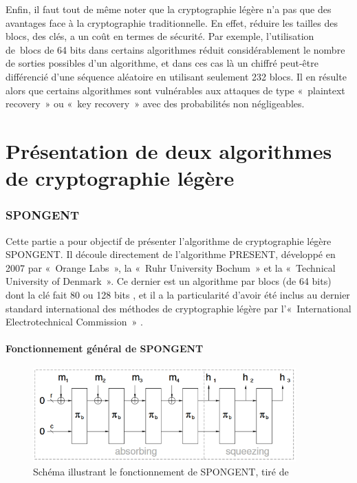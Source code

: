 			Enfin, il faut tout de même noter que la cryptographie légère n'a pas que des
		avantages face à la cryptographie traditionnelle. En effet, réduire les
		tailles des blocs, des clés, a un coût en termes de sécurité. Par exemple,
		l'utilisation de blocs de 64 bits dans certains algorithmes réduit
		considérablement le nombre de sorties possibles d'un algorithme, et dans ces
		cas là un chiffré peut-être différencié d'une séquence aléatoire en utilisant
		seulement 232 blocs. Il en résulte alors que certains algorithmes sont
		vulnérables aux attaques de type « plaintext recovery » ou « key recovery »
		avec des probabilités non négligeables.

\newpage
\part{Présentation de deux algorithmes de cryptographie légère}

	\section{SPONGENT}

			Cette partie a pour objectif de présenter l'algorithme de cryptographie légère
		SPONGENT. Il découle directement de l'algorithme PRESENT, développé en 2007
		par « Orange Labs », la « Ruhr University Bochum » et la « Technical
		University of Denmark ». Ce dernier est un algorithme par blocs (de 64 bits)
		dont la clé fait 80 ou 128 bits \cite{PRESENT}, et il a la particularité
		d'avoir été inclus au dernier standard international des méthodes de
		cryptographie légère par l'« International Electrotechnical Commission »
		\cite{ultraLightURL}.

		\subsection{Fonctionnement général de SPONGENT}

			\begin{figure}[!h]
				 	\centering
				 	\includegraphics[width=0.9\textwidth]{imgs/Spongent/fctGlobalSpongent.png}
				 	\caption{Schéma illustrant le fonctionnement de SPONGENT, tiré de \cite{6275435}}
				 	\label{fctGlobalSpongent}
			\end{figure}

